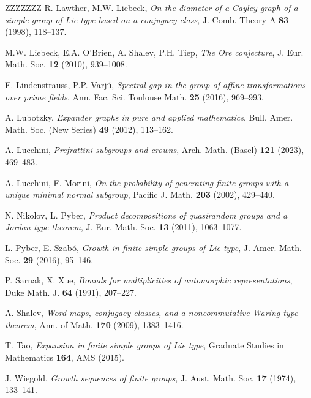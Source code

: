 \documentclass[11pt,reqno]{amsart}
\numberwithin{equation}{section}
\theoremstyle{definition}
\theoremstyle{remark}
\begin{document}
\begin{thebibliography}{ZZZZZZZ}
 R. Lawther, M.W. Liebeck,
\textit{On the diameter of a Cayley graph of a simple group of Lie type based on a conjugacy class},
J. Comb. Theory A \textbf{83} (1998), 118--137.

 M.W. Liebeck, E.A. O'Brien, A. Shalev, P.H. Tiep,
\textit{The Ore conjecture},
J. Eur. Math. Soc. \textbf{12} (2010), 939--1008.

 E. Lindenstrauss, P.P. Varj\'u,
\textit{Spectral gap in the group of affine transformations over prime fields},
Ann. Fac. Sci. Toulouse Math. \textbf{25} (2016), 969--993.

 A. Lubotzky,
\textit{Expander graphs in pure and applied mathematics},
Bull. Amer. Math. Soc. (New Series) \textbf{49} (2012), 113--162.

 A. Lucchini,
\textit{Prefrattini subgroups and crowns},
Arch. Math. (Basel) \textbf{121} (2023), 469--483.

 A. Lucchini, F. Morini,
\textit{On the probability of generating finite groups with a unique minimal normal subgroup},
Pacific J. Math. \textbf{203} (2002), 429--440.

 N. Nikolov, L. Pyber,
\textit{Product decompositions of quasirandom groups and a Jordan type theorem},
J. Eur. Math. Soc. \textbf{13} (2011), 1063--1077.

 L. Pyber, E. Szab\'o,
\textit{Growth in finite simple groups of Lie type},
J. Amer. Math. Soc. \textbf{29} (2016), 95--146.

 P. Sarnak, X. Xue,
\textit{Bounds for multiplicities of automorphic representations},
Duke Math. J. \textbf{64} (1991), 207--227.

 A. Shalev,
\textit{Word maps, conjugacy classes, and a noncommutative Waring-type theorem},
Ann. of Math. \textbf{170} (2009), 1383--1416.

 T. Tao,
\textit{Expansion in finite simple groups of Lie type},
Graduate Studies in Mathematics \textbf{164}, AMS (2015).

 J. Wiegold,
\textit{Growth sequences of finite groups},
J. Aust. Math. Soc. \textbf{17} (1974), 133--141.


   \end{thebibliography}
   
   \vspace{0.2cm}
\end{document}
